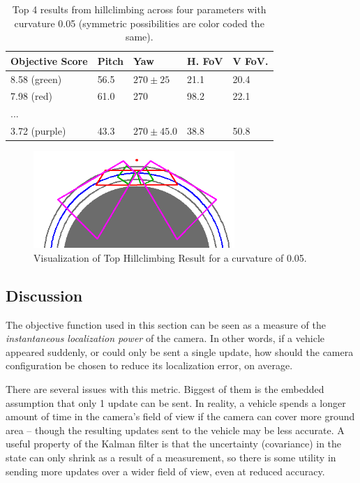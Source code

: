 \documentclass[a4paper,12pt,twoside,openright]{report}
\begin{document}
\begin{table}[htb]
    \centering
    \caption[Hillclimbing Top Scorers]{Top 4 results from hillclimbing across four parameters with curvature 0.05 (symmetric possibilities are color coded the same).}
    \label{tab:simpleobjective:hillclimb}
    \begin{tabular}{@{}lllll@{}}
        \toprule
        Objective Score & Pitch & Yaw        & H. FoV & V FoV. \\ \midrule
        8.58  (green)   & 56.5 & $270\pm25$ & 21.1  & 20.4  \\
        7.98  (red)     & 61.0 & 270     & 98.2  & 22.1  \\ 
        ... \\
        3.72  (purple)  & 43.3  &  $270\pm45.0$ & 38.8   & 50.8   \\ \bottomrule
    \end{tabular}
\end{table}

\begin{figure}[htb]
    \centering
    \includegraphics[width=3in]{figures/simple_objective/hillclimb_curvature.png}
    \caption[Top Hillclimbing Result]{Visualization of Top Hillclimbing Result for a curvature of 0.05.}
    \label{fig:simpleobjective:hillclimb result}
\end{figure}

\subsection{Discussion}

The objective function used in this section can be seen as
a measure of the \textit{instantaneous localization power}
of the camera. In other words, if a vehicle appeared suddenly, or
could only be sent a single update, how should the camera configuration be chosen
to reduce its localization error, on average.

There are several issues with this metric. Biggest of them
is the embedded assumption that only 1 update can be sent.
In reality, a vehicle spends a longer amount of time in the camera's
field of view if the camera can cover more ground area -- 
though the resulting updates sent to the vehicle may be
less accurate. A useful property of the Kalman
filter is that the uncertainty (covariance) in the state
can only shrink as a result of a measurement, so there is some
utility in sending more updates over a wider field of view,
even at reduced accuracy. 
\end{document}

